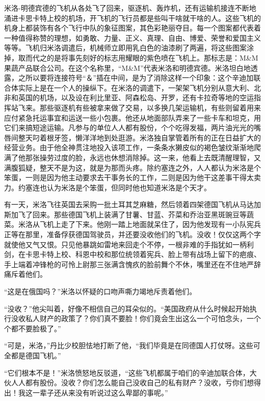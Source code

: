     米洛-明德宾德的飞机从各处飞了回来，驱逐机、轰炸机，还有运输机接连不断地涌进卡思卡特上校的机场，开飞机的飞行员都是些叫干啥就干啥的人。这些飞机的机身上都装饰有各个飞行中队的象征图案，其色彩艳丽夺目。每一个图案都代表着一种值得称赞的理想，如勇敢、力量、正义、真理、自由、博爱、荣誉和爱国主义等等。飞机归米洛调遣后，机械师立即用乳白色的油漆刷了两遍，将这些图案涂掉，取而代之的是将事先刻好的标志用耀眼的紫色喷在飞机上。那标志是：M&M果蔬产品联合公司。在这个名称里，“M&M”代表米洛和明德宾德。米洛坦白地透露，之所以要将连接符号“＆”插在中间，是为了消除这样一个印象：这个辛迪加联合体实际上是在一个人的操纵下。在米洛的调遣下，一架架飞机分别从意大利、北非和英国的机场，以及设在利比里亚、阿森松岛、开罗，还有卡拉奇等地的空运指挥站飞来。那些驱逐机有些被拿来做了交易，以多换几架运输机，有些则留着用来应付紧急托运事宜和运送一些小包裹。他还从地面部队弄来了一些卡车和坦克，用它们来搞短途运输。凡参与的单位人人都有股份，个个吃得发福，两片油光光的嘴唇间整天叼着根牙签，懒洋洋地到处逛游。米洛独自掌管着所有的正在日益扩大的经营业务。由于他全神贯注地投入该项工作，一条条水獭皮似的褐色皱纹渐渐地爬满了他那张操劳过度的脸，永远也休想消除掉。这一来，他看上去既清醒理智，又满腹狐疑，整天不是为这，就是为那而头疼。除约塞连之外，人人都认为米洛是个笨蛋，一则是因为他主动要求去干事务长的工作，二则是因为他干这差事干得太卖力。约塞连也认为米洛是个笨蛋，但同时他也知道米洛是个天才。

    有一天，米洛飞往英国去采购一批土耳其芝麻糖，然后领着四架德国飞机从马达加斯加飞了回来。那些德国飞机上装满了甘薯、甘蓝、芥菜和乔治亚黑斑豌豆等蔬菜。米洛从飞机上走了下来。他刚一踏上地面就呆住了，因为他发现有一小队宪兵正等在那里，准备俘获德国驾驶员，并还要没收他们的飞机。没收！仅仅这两个字就使他又气又恨。只见他暴跳如雷地来回走个不停，一根非难的手指犹如一柄利剑，在卡思卡特上校、科恩中校和那位统领着宪兵、脸上带有战场上留下的疤痕、手上端着冲锋枪的可怜上尉那三张满含愧疚的脸前舞个不休，嘴里还在不住地严辞痛斥着他们。

    “这是在俄国吗？”米洛以怀疑的口吻声嘶力竭地斥责着他们。

    “没收？”他尖叫着，好像不相信自己的耳朵似的。“美国政府从什么时候起开始执行没收私人财产的政策了？你们真不要脸！你们竟会生出这么一个可怕念头，一个个都不要脸极了。”

    “可是，米洛，”丹比少校胆怯地打断了他，“我们毕竟是在同德国人打仗呀。这些可全都是德国飞机。”

    “它们根本不是！”米洛愤怒地反驳道，“这些飞机都属于咱们的辛迪加联合体，大伙人人都有股份。没收？你们怎么能自己没收自己的私有财产？没收，亏你们想得出！我这一辈子还从来没有听说过这么卑鄙的事呢。”

